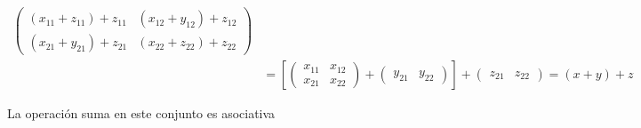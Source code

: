 \begin{exercise}
\begin{align*}
\begin{pmatrix}
			                  (x_{11}+z_{11})+z_{11} & (x_{12}+y_{12})+z_{12} \\(x_{21}+y_{21})+z_{21}&(x_{22}+z_{22})+z_{22}
		                  \end{pmatrix}               \\
		 & =\left[\begin{pmatrix}
				          x_{11} & x_{12} \\x_{21}&x_{22}
			          \end{pmatrix}+\begin{pmatrix}y_{21} & y_{22}
			                        \end{pmatrix}\right]+\begin{pmatrix}z_{21} & z_{22}
		                                             \end{pmatrix}=(x+y)+z
	\end{align*}

	La operación suma en este conjunto es asociativa
\end{exercise}

